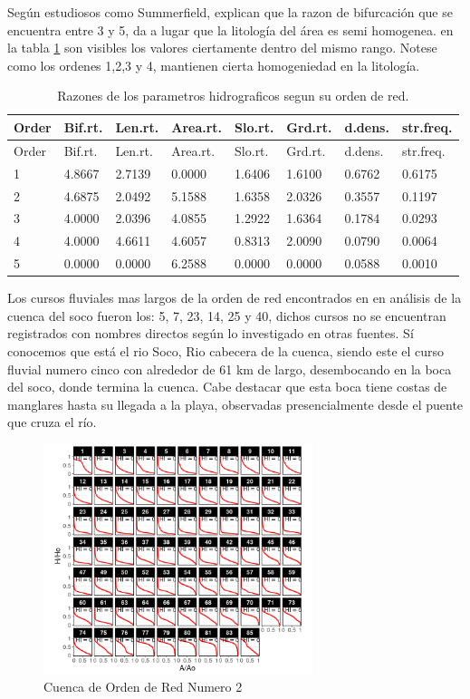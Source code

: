 \documentclass[11pt,]{article}
\begin{document}
Según estudiosos como Summerfield, explican que la razon de bifurcación
que se encuentra entre 3 y 5, da a lugar que la litología del área es
semi homogenea. en la tabla \ref{tablasiete} son visibles los valores
ciertamente dentro del mismo rango. Notese como los ordenes 1,2,3 y 4,
mantienen cierta homogeniedad en la litología.

\begin{longtable}[]{@{}llllllll@{}}
\caption{\label{tablasiete}Razones de los parametros hidrograficos segun
su orden de red.}\tabularnewline
\toprule
Order & Bif.rt. & Len.rt. & Area.rt. & Slo.rt. & Grd.rt. & d.dens. &
str.freq.\tabularnewline
\midrule
\endfirsthead
\toprule
Order & Bif.rt. & Len.rt. & Area.rt. & Slo.rt. & Grd.rt. & d.dens. &
str.freq.\tabularnewline
\midrule
\endhead
1 & 4.8667 & 2.7139 & 0.0000 & 1.6406 & 1.6100 & 0.6762 &
0.6175\tabularnewline
2 & 4.6875 & 2.0492 & 5.1588 & 1.6358 & 2.0326 & 0.3557 &
0.1197\tabularnewline
3 & 4.0000 & 2.0396 & 4.0855 & 1.2922 & 1.6364 & 0.1784 &
0.0293\tabularnewline
4 & 4.0000 & 4.6611 & 4.6057 & 0.8313 & 2.0090 & 0.0790 &
0.0064\tabularnewline
5 & 0.0000 & 0.0000 & 6.2588 & 0.0000 & 0.0000 & 0.0588 &
0.0010\tabularnewline
\bottomrule
\end{longtable}

Los cursos fluviales mas largos de la orden de red encontrados en en
análisis de la cuenca del soco fueron los: 5, 7, 23, 14, 25 y 40, dichos
cursos no se encuentran registrados con nombres directos según lo
investigado en otras fuentes. Sí conocemos que está el rio Soco, Rio
cabecera de la cuenca, siendo este el curso fluvial numero cinco con
alrededor de 61 km de largo, desembocando en la boca del soco, donde
termina la cuenca. Cabe destacar que esta boca tiene costas de manglares
hasta su llegada a la playa, observadas presencialmente desde el puente
que cruza el río.

\begin{figure}
\centering
\includegraphics[width=0.70000\textwidth]{c de red o dos.png}
\caption{Cuenca de Orden de Red Numero 2\label{mapados}}
\end{figure}
\end{document}
